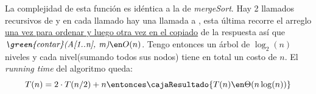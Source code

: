 La complejidad de esta función es idéntica a la de \textit{mergeSort}. Hay 2 llamados recursivos de \textit{} y en cada llamado hay una
llamada a \textit{}, esta última recorre el arreglo \ul{una vez para ordenar y luego otra vez en el copiado} de la respuesta así que
$\textit{\green{contar}(A[1..n], m)} \en O(n)$. Tengo entonces un árbol de $\log_2(n)$ niveles y cada nivel(sumando todos sus nodos) tiene en total
un costo de $n$. El \textit{running time} del algoritmo queda:
$$
  T(n) = 2\cdot T(n/2) + n
  \entonces
  \cajaResultado{
    T(n) \en \Theta(n \log(n))
  }
$$

\fin
